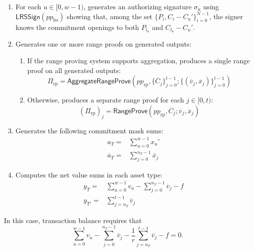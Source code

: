 \documentclass{article}
\newcommand{\func}[1]{\mathsf{#1}}
\begin{document}
\begin{enumerate}
    \item For each $u \in [0,w-1)$, generates an authorizing signature $\sigma_u$ using $\func{LRSSign}(pp_{\text{lrs}})$ showing that, among the set $\{P_i, C_i - C_u'\}_{i=0}^{N-1}$, the signer knows the commitment openings to both $P_{l_u}$ and $C_{l_u} - C_u'$.
    \item Generates one or more range proofs on generated outputs:
    \begin{enumerate}
        \item If the range proving system supports aggregation, produces a single range proof on all generated outputs:
        $$\Pi_{\text{rp}} = \func{AggregateRangeProve}(pp_{\text{rp}},\{\overline{C}_j\}_{j=0}^{t-1} ; \{(\overline{v}_j, \overline{x}_j)\}_{j=0}^{t-1})$$
        \item Otherwise, produces a separate range proof for each $j \in [0,t)$:
        $$(\Pi_{\text{rp}})_j = \func{RangeProve}(pp_{\text{rp}},\overline{C}_j ; \overline{v}_j, \overline{x}_j)$$
    \end{enumerate}
    \item\label{step:conversion-prover-mask-sums} Generates the following commitment mask sums:
    \begin{align*}
        a_T =& \sum_{u=0}^{w-1} x_u' \\
        \overline{a}_T =& \sum_{j=0}^{n_T-1} \overline{x}_j
    \end{align*}
    \item Computes the net value sums in each asset type:
    \begin{align*}
        y_T =& \sum_{u=0}^{w-1} v_u - \sum_{j=0}^{n_T-1} \overline{v}_j - f \\
        y_{T'} =& \sum_{j=n_T}^{t-1} \overline{v}_j
    \end{align*}
\end{enumerate}

In this case, transaction balance requires that $$\sum_{u=0}^{w-1} v_u - \sum_{j=0}^{n_T-1} \overline{v}_j - \frac{1}{r}\sum_{j=n_T}^{t-1} \overline{v}_j - f = 0.$$
\end{document}
